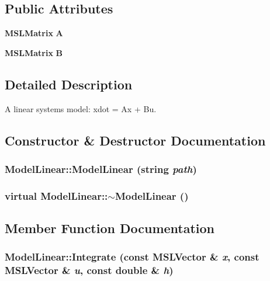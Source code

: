 \subsection*{Public Attributes}
\begin{CompactItemize}
\item 
{\bf MSLMatrix} {\bf A}
\item 
{\bf MSLMatrix} {\bf B}
\end{CompactItemize}


\subsection{Detailed Description}
A linear systems model: xdot = Ax + Bu.



\subsection{Constructor \& Destructor Documentation}
\subsubsection{\setlength{\rightskip}{0pt plus 5cm}Model\-Linear::Model\-Linear (string {\em path})}\label{classModelLinear_a0}


\subsubsection{\setlength{\rightskip}{0pt plus 5cm}virtual Model\-Linear::$\sim$Model\-Linear ()\hspace{0.3cm}{\tt  [inline, virtual]}}\label{classModelLinear_a1}




\subsection{Member Function Documentation}
\subsubsection{ Model\-Linear::Integrate (const {\bf MSLVector} \& {\em x}, const {\bf MSLVector} \& {\em u}, const double \& {\em h})\hspace{0.3cm}{\tt  [virtual]}}\label{classModelLinear_a3}


